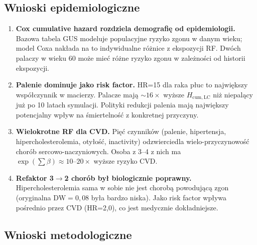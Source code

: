 \documentclass[11pt,a4paper]{article}
\newcommand{\cum}[1][]{H_{\mathrm{cum}#1}}
\begin{document}
\subsection{Wnioski epidemiologiczne}

\begin{enumerate}[leftmargin=*, itemsep=4pt, resume]
  \item \textbf{Cox cumulative hazard rozdziela demografię od epidemiologii.} Bazowa tabela GUS modeluje populacyjne ryzyko zgonu w danym wieku; model Coxa nakłada na to indywidualne różnice z ekspozycji RF. Dwóch palaczy w wieku 60 może mieć różne ryzyko zgonu w zależności od historii ekspozycji.

  \item \textbf{Palenie dominuje jako risk factor.} HR=15 dla raka płuc to największy współczynnik w macierzy. Palacze mają $\sim 16\times$ wyższe $\cum[,\mathrm{LC}]$ niż niepalący już po 10 latach symulacji. Polityki redukcji palenia mają największy potencjalny wpływ na śmiertelność z konkretnej przyczyny.

  \item \textbf{Wielokrotne RF dla CVD.} Pięć czynników (palenie, hipertensja, hipercholesterolemia, otyłość, inactivity) odzwierciedla wielo-przyczynowość chorób sercowo-naczyniowych. Osoba z 3--4 z nich ma $\exp(\sum \beta) \approx 10\text{--}20\times$ wyższe ryzyko CVD.

  \item \textbf{Refaktor 3$\to$2 chorób był biologicznie poprawny.} Hipercholesterolemia sama w sobie nie jest chorobą powodującą zgon (oryginalna $\text{DW}=0{,}08$ była bardzo niska). Jako risk factor wpływa pośrednio przez CVD (HR=2{,}0), co jest medycznie dokładniejsze.
\end{enumerate}

\subsection{Wnioski metodologiczne}
\end{document}
